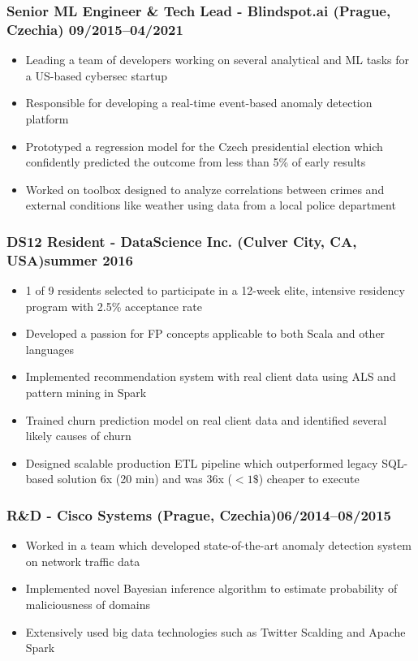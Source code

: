 \documentclass[11pt]{article}
\begin{document}
\subsubsection*{\bf Senior ML Engineer \& Tech Lead - Blindspot.ai (Prague, Czechia) \hfill 09/2015--04/2021}
	 \begin{itemize}
		\setlength\itemsep{-0.25em}
		\item Leading a team of developers working on several analytical and ML tasks for a US-based cybersec startup
		\item Responsible for developing a real-time event-based anomaly detection platform
		\item Prototyped a regression model for the Czech presidential election which confidently predicted the outcome from less than 5\% of early results
		\item Worked on toolbox designed to analyze correlations between crimes and external conditions like weather using data from a local police department
	 \end{itemize}

\subsubsection*{\bf DS12 Resident - DataScience Inc. (Culver City, CA, USA)\hfill summer 2016}
	 \begin{itemize}
		\setlength\itemsep{-0.25em}
		\item 1 of 9 residents selected to participate in a 12-week elite, intensive residency program with 2.5\% acceptance rate
		\item Developed a passion for FP concepts applicable to both Scala and other languages
		\item Implemented recommendation system with real client data using ALS and pattern mining in Spark
		\item Trained churn prediction model on real client data and identified several likely causes of churn
		\item Designed scalable production ETL pipeline which outperformed legacy SQL-based solution 6x (20 min) and was 36x ($< 1\$$) cheaper to execute
	 \end{itemize}

\subsubsection*{R\&D - Cisco Systems (Prague, Czechia)\hfill 06/2014--08/2015}
	 \begin{itemize}
		\setlength\itemsep{-0.25em}
		\item Worked in a team which developed state-of-the-art anomaly detection system on network traffic data
		\item Implemented novel Bayesian inference algorithm to estimate probability of maliciousness of domains
		\item Extensively used big data technologies such as Twitter Scalding and Apache Spark
	 \end{itemize}
\end{document}
